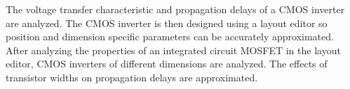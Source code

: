 The voltage transfer characteristic and propagation delays of a CMOS inverter are analyzed. The CMOS inverter is then designed using a layout editor so position and dimension specific parameters can be accurately approximated. After analyzing the properties of an integrated circuit MOSFET in the layout editor, CMOS inverters of different dimensions are analyzed. The effects of transistor widths on propagation delays are approximated.
